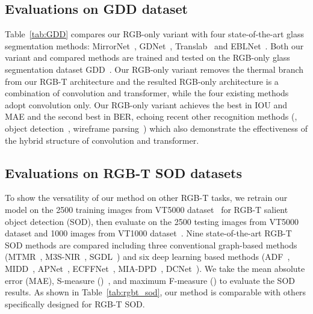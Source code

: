 \subsection{Evaluations on GDD dataset~\cite{mei2020don}}
\label{sec:GDD}
Table~\ref{tab:GDD} compares our RGB-only variant with four state-of-the-art glass segmentation methods: MirrorNet~\cite{yang2019my}, GDNet~\cite{mei2020don}, Translab~\cite{xie2020segmenting} and EBLNet~\cite{He_2021_ICCV}. Both our variant and compared methods are trained and tested on the RGB-only glass segmentation dataset GDD~\cite{mei2020don}. Our RGB-only variant removes the thermal branch from our RGB-T architecture and the resulted RGB-only architecture is a combination of convolution and transformer, while the four existing methods adopt convolution only. 
Our RGB-only variant achieves the best in IOU and MAE and the second best in BER, echoing recent other recognition methods (\eg, object detection~\cite{carion2020end}, wireframe parsing~\cite{xu2021line}) which also demonstrate the effectiveness of the hybrid structure of convolution and transformer.



\subsection{Evaluations on RGB-T SOD datasets}
To show the versatility of our method on other RGB-T tasks, we retrain our model on the 2500 training images from VT5000 dataset~\cite{tu2022rgbtbench} for RGB-T salient object detection (SOD), then evaluate on the 2500 testing images from VT5000 dataset and 1000 images from VT1000 dataset~\cite{tu2019rgb}. Nine state-of-the-art RGB-T SOD methods are compared including three conventional graph-based methods (MTMR~\cite{wang2018rgb}, M3S-NIR~\cite{tu2019m3s}, SGDL~\cite{tu2019rgb}) and six deep learning based methods (ADF~\cite{tu2022rgbtbench}, MIDD~\cite{tu2021multi}, APNet~\cite{zhou2021apnet}, ECFFNet~\cite{zhou2021ecffnet}, MIA-DPD~\cite{liang2022multi}, DCNet~\cite{tu2022weakly}). We take the mean absolute error (MAE), S-measure ()~\cite{fan2017structure}, and maximum F-measure () to evaluate the SOD results. As shown in Table~\ref{tab:rgbt_sod}, our method is comparable with others specifically designed for RGB-T SOD.



